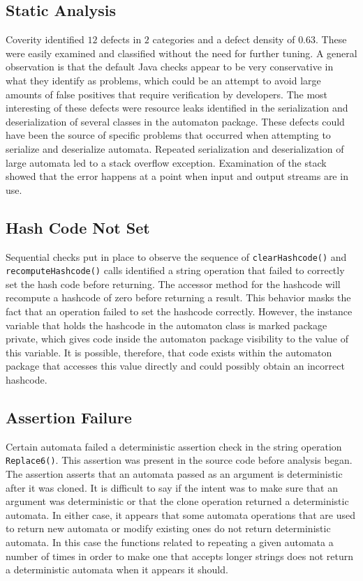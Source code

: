 \documentclass[letterpaper,sigplan]{acmart}
\begin{document}
\subsection{Static Analysis}\label{sec:results-static-analysis}

Coverity identified \(12\) defects in \(2\) categories and a defect density of
\(0.63\).  These were easily examined and classified without the need for
further tuning.  A general observation is that the default Java checks appear
to be very conservative in what they identify as problems, which could be an
attempt to avoid large amounts of false positives that require verification by
developers.  The most interesting of these defects were resource leaks
identified in the serialization and deserialization of several classes in the
automaton package.  These defects could have been the source of specific
problems that occurred when attempting to serialize and deserialize automata.
Repeated serialization and deserialization of large automata led to a stack
overflow exception.  Examination of the stack showed that the error happens at
a point when input and output streams are in use.

\subsection{Hash Code Not Set}\label{sec:results-hashcode-not-set}

Sequential checks put in place to observe the sequence of
\lstinline{clearHashcode()} and \lstinline{recomputeHashcode()} calls
identified a string operation that failed to correctly set the hash code before
returning.  The accessor method for the hashcode will recompute a hashcode of
zero before returning a result.  This behavior masks the fact that an operation
failed to set the hashcode correctly.  However, the instance variable that
holds the hashcode in the automaton class is marked package private, which
gives code inside the automaton package visibility to the value of this
variable.  It is possible, therefore, that code exists within the automaton
package that accesses this value directly and could possibly obtain an
incorrect hashcode.

\subsection{Assertion Failure}\label{sec:results-assertion-failure}

Certain automata failed a deterministic assertion check in the string operation
\lstinline{Replace6()}.  This assertion was present in the source code before
analysis began.  The assertion asserts that an automata passed as an argument is
deterministic after it was cloned.  It is difficult to say if the intent was to
make sure that an argument was deterministic or that the clone operation
returned a deterministic automata.  In either case, it appears that some
automata operations that are used to return new automata or modify existing
ones do not return deterministic automata.  In this case the functions related
to repeating a given automata a number of times in order to make one that
accepts longer strings does not return a deterministic automata when it appears
it should.
\end{document}
